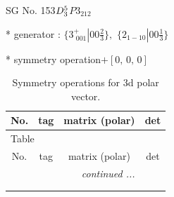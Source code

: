 \documentclass[fleqn,8pt]{jsarticle}
\begin{document}
\setcounter{MaxMatrixCols}{32}

\renewcommand{\tablename}{Table~}
\renewcommand{\figurename}{Figure~}
\begin{center}
\LARGE
SG No. 153\quad$D_{\rm 3}^{5}$\quad$P3_212$\quad[ trigonal ]
\end{center}

* generator : $\{3^{+}_{\,\,001}|0 0 \frac{2}{3}\},\,\,\{2{}_{1-10}|0 0 \frac{1}{3}\}$

* symmetry operation\quad$+\left[ 0,\, 0,\, 0 \right]$
\renewcommand{\arraystretch}{1.3}
\begin{longtable}{cccc}
\caption{Symmetry operations for 3d polar vector.}
 \\
 \hline \hline
No. & tag & matrix (polar) & det \\ \hline \endfirsthead

\multicolumn{3}{l}{\tablename\ \thetable{}} \\
 \hline \hline
No. & tag & matrix (polar) & det \\ \hline \endhead

 \hline \hline
\multicolumn{3}{r}{\footnotesize\it continued ...} \\ \endfoot

 \hline \hline
\multicolumn{3}{r}{} \\ \endlastfoot


\end{longtable}
\end{document}
